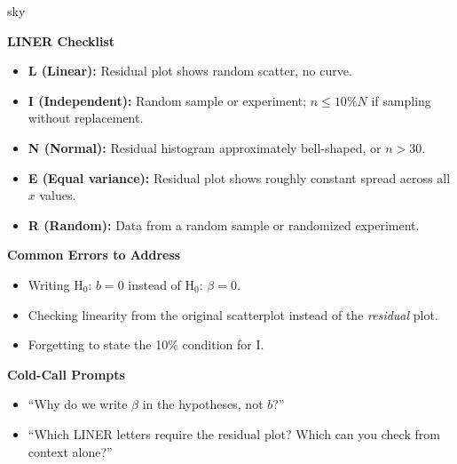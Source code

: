 \documentclass[10pt]{article}
\begin{document}
\begin{skillbox}{sky}
\begin{minipage}[t]{0.48\linewidth}
    \textbf{LINER Checklist}
    \begin{itemize}
        \item \textbf{L (Linear):} Residual plot shows random scatter, no curve.
        \item \textbf{I (Independent):} Random sample or experiment; $n \le 10\%N$
              if sampling without replacement.
        \item \textbf{N (Normal):} Residual histogram approximately bell-shaped,
              or $n > 30$.
        \item \textbf{E (Equal variance):} Residual plot shows roughly constant spread
              across all $x$ values.
        \item \textbf{R (Random):} Data from a random sample or randomized experiment.
    \end{itemize}
\end{minipage}
\hfill
\begin{minipage}[t]{0.48\linewidth}
    \textbf{Common Errors to Address}
    \begin{itemize}
        \item Writing H$_0$: $b = 0$ instead of H$_0$: $\beta = 0$.
        \item Checking linearity from the original scatterplot instead of the
              \emph{residual} plot.
        \item Forgetting to state the 10\% condition for I.
    \end{itemize}
    \textbf{Cold-Call Prompts}
    \begin{itemize}
        \item ``Why do we write $\beta$ in the hypotheses, not $b$?''
        \item ``Which LINER letters require the residual plot? Which can you check
              from context alone?''
    \end{itemize}
\end{minipage}
\end{skillbox}
\end{document}

